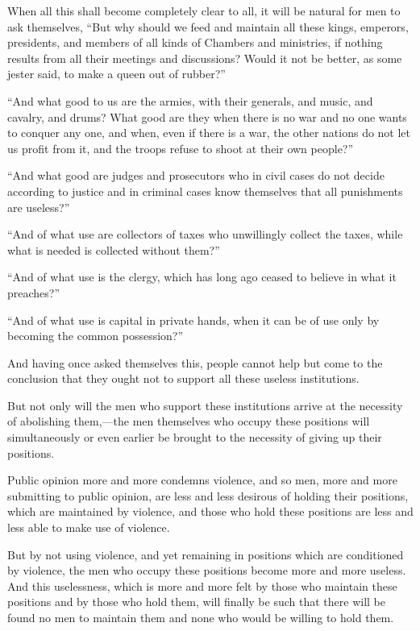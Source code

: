 \documentclass{book}
\begin{document}
When all this shall become completely clear to all, it will be natural for men to ask themselves, “But why should we feed and maintain all these kings, emperors, presidents, and members of all kinds of Chambers and ministries, if nothing results from all their meetings and discussions? Would it not be better, as some jester said, to make a queen out of rubber?”

“And what good to us are the armies, with their generals, and music, and cavalry, and drums? What good are they when there is no war and no one wants to conquer any one, and when, even if there is a war, the other nations do not let us profit from it, and the troops refuse to shoot at their own people?”

“And what good are judges and prosecutors who in civil cases do not decide according to justice and in criminal cases know themselves that all punishments are useless?”

“And of what use are collectors of taxes who unwillingly collect the taxes, while what is needed is collected without them?”

“And of what use is the clergy, which has long ago ceased to believe in what it preaches?”

“And of what use is capital in private hands, when it can be of use only by becoming the common possession?”

And having once asked themselves this, people cannot help but come to the conclusion that they ought not to support all these useless institutions.

But not only will the men who support these institutions arrive at the necessity of abolishing them,—the men themselves who occupy these positions will simultaneously or even earlier be brought to the necessity of giving up their positions.

Public opinion more and more condemns violence, and so men, more and more submitting to public opinion, are less and less desirous of holding their positions, which are maintained by violence, and those who hold these positions are less and less able to make use of violence.

But by not using violence, and yet remaining in positions which are conditioned by violence, the men who occupy these positions become more and more useless. And this uselessness, which is more and more felt by those who maintain these positions and by those who hold them, will finally be such that there will be found no men to maintain them and none who would be willing to hold them.
\end{document}
